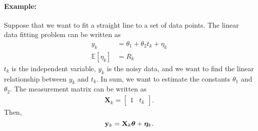 \paragraph{Example:} Suppose that we want to fit a straight line to a set of data points. The linear data fitting problem can be written as 
\begin{align*}
	y_k &= \theta_1+\theta_2t_k+\eta_k\\
	\mathbb{E}[\eta_k] &= R_k
\end{align*}
$t_k$ is the independent variable, $y_k$ is the noisy data, and we want to find the linear relationship between $y_k$ and $t_k$. In sum, we want to estimate the constants $\theta_1$ and $\theta_2$. The measurement matrix can be written as 
\begin{align*}
	\mathbf{X}_k = \begin{bmatrix}
		1 & t_k
	\end{bmatrix}.
\end{align*}
Then, 
$${\mathbf{y}}_k = \mathbf{X}_k\boldsymbol{\theta}+\boldsymbol{\eta}_k.$$

